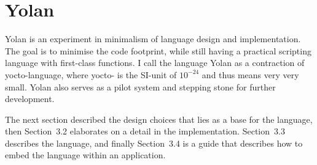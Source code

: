 \documentclass[11pt]{report}
\begin{document}
%
%
%
%
\chapter{Yolan}
\label{yolan}
Yolan is an experiment in minimalism of language design and implementation. 
The goal is to minimise the code footprint, while still having a practical scripting language with first-class functions.
I call the language Yolan as a contraction of yocto-language, where yocto- is the SI-unit of $10^{-24}$ and thus means very very small.
Yolan also serves as a pilot system and stepping stone for further development.

The next section described the design choices that lies as a base for the language, then Section~3.2 elaborates on a detail in the implementation. Section~3.3 describes the language, and finally Section~3.4 is a guide that describes how to embed the language within an application.
\end{document}
